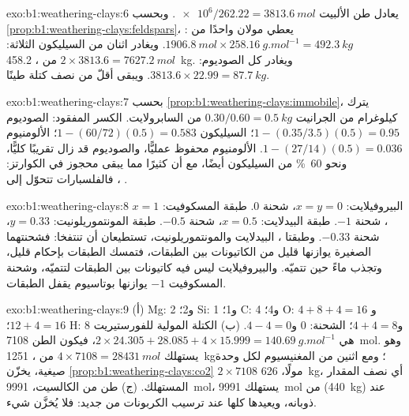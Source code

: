 \begin{solution}{exo:b1:weathering-clays:6}
يعادل طن الألبيت $\num{e6}/262.22 = \qty{3813.6}{mol}$. وبحسب \cref{prop:b1:weathering-clays:feldspars}، يعطي مولان واحدًا من :
$\qty{1906.8}{mol} \times \qty{258.16}{g.mol^{-1}} = \qty{492.3}{kg}$. ويغادر اثنان من السيليكون الثلاثة:
$2\times3813.6 = \qty{7627.2}{mol}$ من ، \qty{458.2}{kg}. ويغادر كل الصوديوم: $3813.6\times22.99 =
\qty{87.7}{kg}$. ويبقى أقلّ من نصف كتلة  طينًا.
\end{solution}

\begin{solution}{exo:b1:weathering-clays:7}
بحسب \cref{prop:b1:weathering-clays:immobile}، يترك كيلوغرام من الجرانيت $0.30/0.60 = \qty{0.5}{kg}$ من السابرولايت. الكسر المفقود: الصوديوم $1 -
(0.35/3.5)(0.5) = 0.95$؛ السيليكون $1 - (60/72)(0.5) = 0.583$؛ الألومنيوم $1 -
(27/14)(0.5) = 0.036$. الألومنيوم محفوظ عمليًّا، والصوديوم قد زال تقريبًا كليًّا، ونحو \qty{60}{\percent} من السيليكون أيضًا، مع أن كثيرًا مما يبقى محجوز في الكوارتز: فالفلسبارات تتحوّل إلى ، .
\end{solution}

\begin{solution}{exo:b1:weathering-clays:8}
البيروفيلايت: $x = y = 0$، شحنة 0. طبقة المسكوفيت: $x = 1$، شحنة $-1$. طبقة البيدلايت: $x = 0.5$، شحنة $-0.5$. طبقة المونتموريلونيت: $y = 0.33$، شحنة $-0.33$. وطبقتا ، البيدلايت والمونتموريلونيت، تستطيعان أن تنتفخا: فشحنتهما الصغيرة يوازنها قليل من الكاتيونات بين الطبقات، فتمسك الطبقات بإحكام قليل، وتجذب ماءً حين تتميّه. والبيروفيلايت ليس فيه كاتيونات بين الطبقات لتتميّه، وشحنة المسكوفيت $-1$ يوازنها بوتاسيوم يقفل الطبقات.
\end{solution}

\begin{solution}{exo:b1:weathering-clays:9}
(أ) Mg: 2 و\num{2}؛ Si: 1 و\num{1}؛ C: 4 و\num{4}؛ O: $4 + 8 + 4 = 16$ و$12 + 4 =
16$؛ H: 8 و$4 + 4 = 8$؛ الشحنة: 0 و$4 - 4 = 0$. (ب) الكتلة المولية للفورستيريت هي $2\times24.305 + 28.085 + 4\times15.999 =
\qty{140.69}{g.mol^{-1}}$، فيكون الطن \qty{7108}{mol}. وهو يستهلك
$4\times7108 = \qty{28431}{mol}$ من ، \qty{1251}{kg}؛ ومع اثنين من المغنيسيوم لكل وحدة صيغية، يخزّن \cref{prop:b1:weathering-clays:co2}
$2\times7108$ مولًا، \qty{626}{kg}، أي نصف المقدار المستهلك. (ج) طن من الكالسيت،
\qty{9991}{mol}، يستهلك \qty{9991}{mol} من  (\qty{440}{kg})
عند ذوبانه، ويعيدها كلها عند ترسيب الكربونات من جديد: فلا يُخزَّن شيء.
\end{solution}

